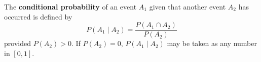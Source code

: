 The \textbf{conditional probability} of an event $A_1$ given that another event $A_2$ has occurred is defined by
$$P(A_1 \mid A_2) = \frac{P(A_1 \cap A_2)}{P(A_2)}$$
provided $P(A_2) > 0$. If $P(A_2) = 0$, $P(A_1 \mid A_2)$ may be taken as any number in $[0,1]$.
